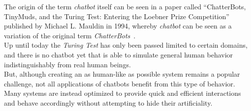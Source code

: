 The origin of the term \emph{chatbot} itself can be seen in a paper called ``ChatterBots, TinyMuds, and the Turing Test: Entering the Loebner Prize Competition'' published by Michael L. Mauldin in 1994, whereby \emph{chatbot} can be seen as a variation of the original term \emph{ChatterBots}~\cite{aiconf}.
\\

Up until today the \emph{Turing Test} has only been passed limited to certain domains, and there is no chatbot yet that is able to simulate general human behavior indistinguishably from real human beings.
\\
But, although creating an as human-like as possible system remains a popular challenge, not all applications of chatbots benefit from this type of behavior.
Many systems are instead optimized to provide quick and efficient interactions and behave accordingly without attempting to hide their artificiality.
